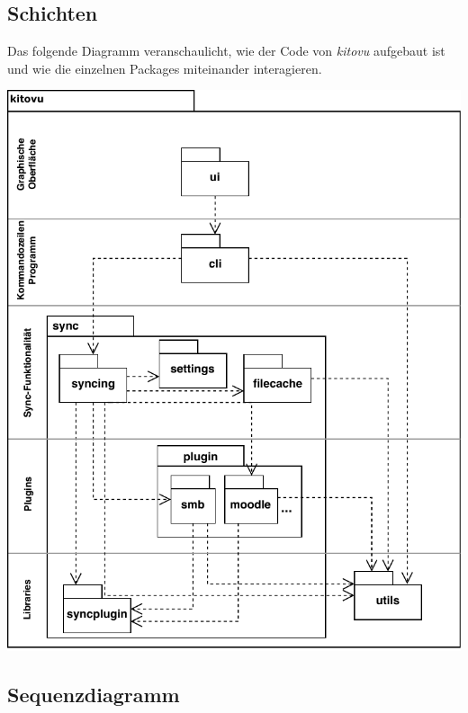 \documentclass[a4paper]{article}
\begin{document}


\subsection{Schichten}

Das folgende Diagramm veranschaulicht, wie der Code von \emph{kitovu} aufgebaut ist und wie die einzelnen Packages miteinander interagieren.

\includegraphics[width=40em]{./img/schichtendiagramm.pdf}

\newpage

\subsection{Sequenzdiagramm}
\end{document}
